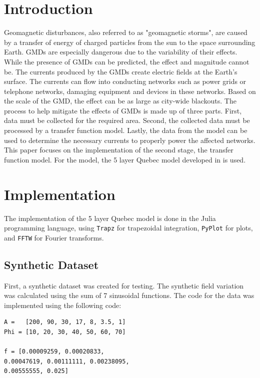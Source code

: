 \documentclass[10pt,a4paper,twoside]{article}
\begin{document}
\begin{multicols}{2}
	\section{Introduction}
	Geomagnetic disturbances, also referred to as "geomagnetic storms", are caused by a transfer of energy of charged particles from the sun to the space surrounding Earth. GMDs are especially dangerous due to the variability of their effects. While the presence of GMDs can be predicted, the effect and magnitude cannot be. The currents produced by the GMDs create electric fields at the Earth's surface. The currents can flow into conducting networks such as power grids or telephone networks, damaging equipment and devices in these networks. Based on the scale of the GMD, the effect can be as large as city-wide blackouts. The process to help mitigate the effects of GMDs is made up of three parts. First, data must be collected for the required area. Second, the collected data must be processed by a transfer function model. Lastly, the data from the model can be used to determine the necessary currents to properly power the affected networks. This paper focuses on the implementation of the second stage, the transfer function model. For the model, the 5 layer Quebec model developed in \cite{8859181} is used.
		
		
		
		
	\section{Implementation}
	The implementation of the 5 layer Quebec model is done in the Julia programming language, using \verb|Trapz| for trapezoidal integration, \verb|PyPlot| for plots, and \verb|FFTW| for Fourier transforms. 
	\subsection{Synthetic Dataset}
	First, a synthetic dataset was created for testing. The synthetic field variation was calculated using the sum of 7 sinusoidal functions. The code for the data was implemented using the following code:
	\begin{lstlisting}
A =   [200, 90, 30, 17, 8, 3.5, 1]
Phi = [10, 20, 30, 40, 50, 60, 70]

f = [0.00009259, 0.00020833, 
0.00047619, 0.00111111, 0.00238095, 
0.00555555, 0.025]


\end{lstlisting}
\end{multicols}
\end{document}
